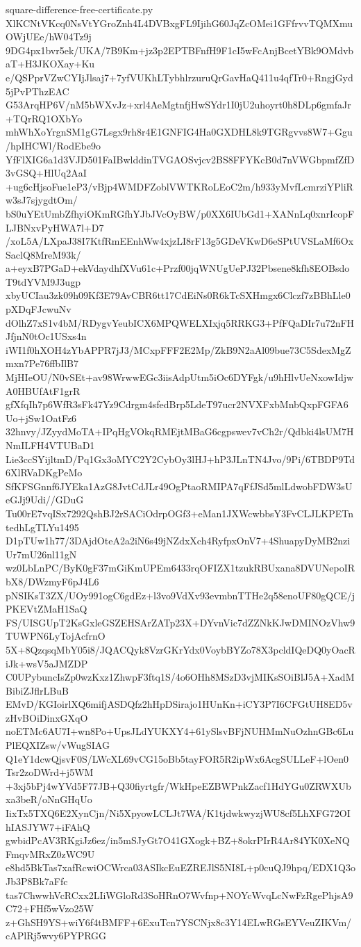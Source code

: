 \documentclass[11pt]{article}
\theoremstyle{definition}
\theoremstyle{remark}
\begin{document}
\begin{filecontents*}[overwrite]{square-difference-free-certificate.py}
XlKCNtVKcq0NsVtYGroZnh4L4DVBxgFL9IjihG60JqZcOMei1GFfrvvTQMXmuOWjUEe/hW04Tz9j
9DG4px1bvr5ek/UKA/7B9Km+jz3p2EPTBFnfH9F1cI5wFcAnjBcetYBk9OMdvbaT+H3JKOXay+Ku
e/QSPprVZwCYIjJlsaj7+7yfVUKhLTybhlrzuruQrGavHaQ411u4qfTr0+RngjGyd5jPvPThzEAC
G53ArqHP6V/nM5bWXvJz+xrl4AeMgtnfjHwSYdr1I0jU2uhoyrt0h8DLp6gmfaJr+TQrRQ1OXbYo
mhWhXoYrgnSM1gG7Lsgx9rh8r4E1GNFIG4Ha0GXDHL8k9TGRgvvs8W7+Ggu/hpIHCWl/RodEbe9o
YfFlXIG6a1d3VJD501FaIBwlddinTVGAOSvjcv2BS8FFYKcB0d7nVWGbpmfZfD3vGSQ+HlUq2AaI
+ug6cHjsoFue1eP3/vBjp4WMDFZoblVWTKRoLEoC2m/h933yMvfLcmrziYPliRw3sJ7sjygdtOm/
bS0uYEtUmbZfhyiOKmRGfhYJbJVcOyBW/p0XX6IUbGd1+XANnLq0xnrIcopFLJBNxvPyHWA7l+D7
/xoL5A/LXpaJ38I7KtfRmEEnhWw4xjzLI8rF13g5GDeVKwD6eSPtUVSLaMf6OxSaclQ8MreM93k/
a+eyxB7PGaD+ekVdaydhfXVu61c+Przf00jqWNUgUePJ32Pbsene8kfh8EOBsdoT9tdYVM9J3ugp
xbyUCIau3zk09h09Kf3E79AvCBR6tt17CdEiNs0R6kTcSXHmgx6Clczf7zBBhLle0pXDqFJcwuNv
dOlhZ7xS1v4bM/RDygvYeubICX6MPQWELXIxjq5RRKG3+PfFQaDIr7u72nFHJfjnN0tOc1USxs4n
iWI1f0hXOH4zYbAPPR7jJ3/MCxpFFF2E2Mp/ZkB9N2aAl09bue73C5SdexMgZmxn7Pe76ffbIlB7
MjHIeOU/N0vSEt+av98WrwwEGc3iisAdpUtm5iOc6DYFgk/u9hHlvUeNxowIdjwA0HBUfAtF1grR
gfXfqIh7p6WfR3sFk47Yz9Cdrgm4sfedBrp5LdeT97ucr2NVXFxbMnbQxpFGFA6Uo+jSw1OatFz6
32hnvy/JZyydMoTA+IPqHgVOkqRMEjtMBaG6cgpswev7vCh2r/Qdbki4lsUM7HNmILFH4VTUBaD1
Lie3ccSYijltmD/Pq1Gx3oMYC2Y2CybOy3lHJ+hP3JLnTN4Jvo/9Pi/6TBDP9Td6XlRVaDKgPeMo
SfKFSGnnf6JYEka1AzG8JvtCdJLr49OgPtaoRMIPA7qFfJSd5mlLdwobFDW3sUeGJj9Udi//GDuG
Tu00rE7vqISx7292QshBJ2rSACiOdrpOGf3+eMan1JXWcwbbsY3FvCLJLKPETntedhLgTLYu1495
D1pTUw1h77/3DAjdOteA2a2iN6s49jNZdxXch4RyfpxOnV7+4ShuapyDyMB2nziUr7mU26nl11gN
wz0LbLnPC/ByK0gF37mGiKmUPEm6433rqOFIZX1tzukRBUxana8DVUNepoIRbX8/DWzmyF6pJ4L6
pNSIKsT3ZX/UOy991ogC6gdEz+l3vo9VdXv93evmbnTTHe2q58enoUF80gQCE/jPKEVtZMaH1SaQ
FS/UISGUpT2KsGxleGSZEHSArZATp23X+DYvnVic7dZZNkKJwDMINOzVhw9TUWPN6LyTojAcfrnO
5X+8QzqsqMbY05i8/JQACQyk8VzrGKrYdx0VoybBYZo78X3pcldIQeDQ0yOacRiJk+wsV5aJMZDP
C0UPybuncIsZp0wzKxz1ZhwpF3ftq1S/4o6OHh8MSzD3vjMIKsSOiBlJ5A+XadMBibiZJflrLBuB
EMvD/KGIoirlXQ6mifjASDQfz2hHpDSirajo1HUnKn+iCY3P7I6CFGtUH8ED5vzHvBOiDinxGXqO
noETMc6AU7I+wn8Po+UpsJLdYUKXY4+61ySlsvBFjNUHMmNuOzhnGBc6LuPlEQXIZsw/vWugSIAG
Q1eY1dcwQjsvF0S/LWcXL69vCG15oBb5tayFOR5R2ipWx6AcgSULLeF+lOen0Tsr2zoDWrd+j5WM
+3xj5bPj4wYVd5F77JB+Q30fiyrtgfr/WkHpeEZBWPnkZacf1HdYGu0ZRWXUbxa3beR/oNnGHqUo
IixTx5TXQ6E2XynCjn/Ni5XpyowLCLJt7WA/K1tjdwkwyzjWU8cf5LhXFG72OIhIASJYW7+iFAhQ
gwbidPcAV3RKgiJz6ez/in5mSJyGt7O41GXogk+BZ+8okrPIrR4Ar84YK0XeNQFmqvMRxZ0zWC9U
e8hd5BkTas7xafRcwiOCWrca03ASIkcEuEZREJlS5NI8L+p0cuQJ9hpq/EDX1Q3oJb3P8Bk7aFfc
tas7ChwwhVcRCxx2LIiWGloRd3SoHRnO7Wvfnp+NOYcWvqLcNwFzRgePhjsA9C72+FHf5wVzo25W
z+GhSH9YS+wiY6f4tBMFF+6ExuTcn7YSCNjx8c3Y14ELwRGsEYVeuZIKVm/cAPlRj5wvy6PYPRGG

\end{filecontents*}
\end{document}
